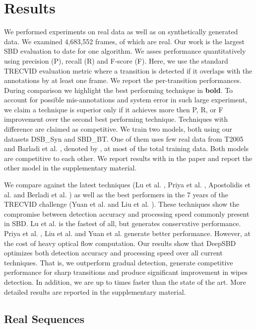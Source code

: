 \documentclass[journal]{IEEEtran}
\begin{document}
\section{Results}

We performed experiments on real data as well as on synthetically generated data. We examined 4,683,552 frames,  of which are real. Our work is the largest SBD evaluation to date for one algorithm. We asses performance quantitatively using precision (P), recall (R) and F-score (F). Here, we use the standard TRECVID evaluation metric \cite{Smeaton10} where a transition is detected if it overlaps with the annotations by at least one frame. We report the per-transition performances. During comparison we highlight the best performing technique in \textbf{bold}. To account for possible mis-annotations and system error in such large experiment, we claim a technique is superior only if it achieves more then  P, R, or F improvement over the second best performing technique. Techniques with  difference are claimed as competitive. We train two models, both using our datasets DSB\_Syn and SBD\_BT. One of them uses few real data from T2005 and Barladi et al. , denoted by \textbf{}, at most  of the total training data. Both models are competitive to each other. We report results with \textbf{} in the paper and report the other model in the supplementary material. 

We compare against the latest techniques (Lu et al. \cite{Lu13}, Priya et al. \cite{Priya14}, Apostolidis et al. \cite{Apostolidis14} and Berladi et al. \cite{Berladi15}) as well as the best performers in the 7 years of the TRECVID challenge (Yuan et al. \cite{Yuan04} and Liu et al. \cite{Liu07}). These techniques show the compromise between detection accuracy and processing speed commonly present in SBD. Lu et al. \cite{Lu13} is the fastest of all, but generates conservative performance. Priya et al. \cite{Priya14}, Liu et al. \cite{Liu07} and Yuan et al. \cite{Yuan04} generate better performance. However, at the cost of heavy optical flow computation. Our results show that DeepSBD optimizes both detection accuracy and processing speed over all current techniques. That is, we outperform gradual detection, generate competitive performance for sharp transitions and produce significant improvement in wipes detection. In addition, we are up to  times faster than the state of the art. More detailed results are reported in the supplementary material. 

\subsection{Real Sequences} 
\end{document}
